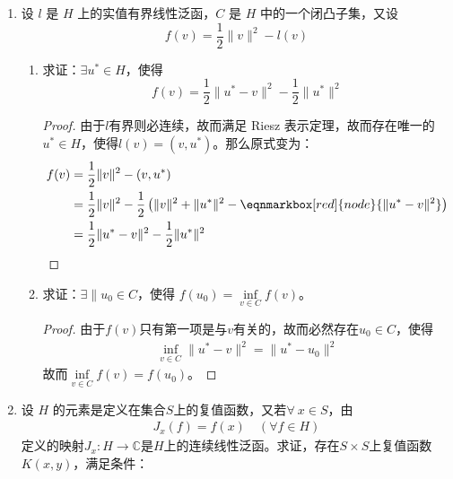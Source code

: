 \begin{enumerate}[leftmargin=2cm, label=\arabic*]
\begin{proof}
\end{proof}
    \item 设 $l$ 是 $H$ 上的实值有界线性泛函，$C$ 是 $H$ 中的一个闭凸子集，又设
\begin{equation*}
    f(v) = \frac{1}{2}\|v\|^2 - l(v)    
\end{equation*}
    \begin{enumerate}[leftmargin=1cm, label=(\arabic*)]
        \item 求证：$\exists u^*\in H$，使得
        \begin{equation*}
            f(v) = \frac{1}{2}\|u^* - v\|^2 - \frac{1}{2}\|u^*\|^2
        \end{equation*}
        \begin{proof}
            由于$l$有界则必连续，故而满足 Riesz 表示定理，故而存在唯一的$u^*\in H$，使得$l(v) = (v, u^*)$。那么原式变为：
            \begin{align*}
                f(v) &= \frac{1}{2}\|v\|^2 - (v, u^*) \\
                & = \frac{1}{2}\|v\|^2 - \frac{1}{2}\left(\|v\|^2 + \|u^*\|^2 - \eqnmarkbox[red]{node}{\|u^*-v\|^2}\right) \\
                & = \frac{1}{2}\|u^* - v\|^2 - \frac{1}{2}\|u^*\|^2 
            \end{align*}
        \end{proof}
        \item 求证：$\exists\| u_0\in C$，使得 $f(u_0) = \inf\limits_{v\in C} f(v)$。
        \begin{proof}
            由于$f(v)$只有第一项是与$v$有关的，故而必然存在$u_0\in C$，使得
            \begin{align*}
                \inf\limits_{v\in C}\|u^*-v\|^2 = \|u^* - u_0\|^2 
            \end{align*}
            故而$\inf\limits_{v\in C}f(v) = f(u_0)$。
        \end{proof}
    \end{enumerate}
    \item 设 $H$ 的元素是定义在集合$S$上的复值函数，又若$\forall\ x\in S$，由
    \begin{align*}
        J_x(f) = f(x)\quad (\forall f\in H)
    \end{align*}
    定义的映射$J_x:H\to\mathbb{C}$是$H$上的连续线性泛函。求证，存在$S\times S$上复值函数$K(x,y)$，满足条件：
    \begin{enumerate}[leftmargin=1cm, label=(\arabic*)]

\end{enumerate}
\end{enumerate}
